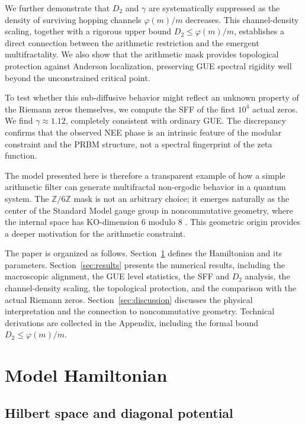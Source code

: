 \documentclass[aps,prl,preprint,superscriptaddress,floatfix]{revtex4-2}
\begin{document}
We further demonstrate that $D_2$ and $\gamma$ are systematically suppressed as the density of surviving hopping channels $\varphi(m)/m$ decreases. This channel-density scaling, together with a rigorous upper bound $D_2 \le \varphi(m)/m$, establishes a direct connection between the arithmetic restriction and the emergent multifractality. We also show that the arithmetic mask provides topological protection against Anderson localization, preserving GUE spectral rigidity well beyond the unconstrained critical point.

To test whether this sub-diffusive behavior might reflect an unknown property of the Riemann zeros themselves, we compute the SFF of the first $10^4$ actual zeros. We find $\gamma \approx 1.12$, completely consistent with ordinary GUE. The discrepancy confirms that the observed NEE phase is an intrinsic feature of the modular constraint and the PRBM structure, not a spectral fingerprint of the zeta function.

The model presented here is therefore a transparent example of how a simple arithmetic filter can generate multifractal non-ergodic behavior in a quantum system. The $\mathbb{Z}/6\mathbb{Z}$ mask is not an arbitrary choice; it emerges naturally as the center of the Standard Model gauge group in noncommutative geometry, where the internal space has KO-dimension 6 modulo 8 \cite{Connes2008,Chamseddine2007}. This geometric origin provides a deeper motivation for the arithmetic constraint.

The paper is organized as follows. Section~\ref{sec:model} defines the Hamiltonian and its parameters. Section~\ref{sec:results} presents the numerical results, including the macroscopic alignment, the GUE level statistics, the SFF and $D_2$ analysis, the channel-density scaling, the topological protection, and the comparison with the actual Riemann zeros. Section~\ref{sec:discussion} discusses the physical interpretation and the connection to noncommutative geometry. Technical derivations are collected in the Appendix, including the formal bound $D_2 \le \varphi(m)/m$.

\section{Model Hamiltonian}
\label{sec:model}

\subsection{Hilbert space and diagonal potential}
\end{document}
